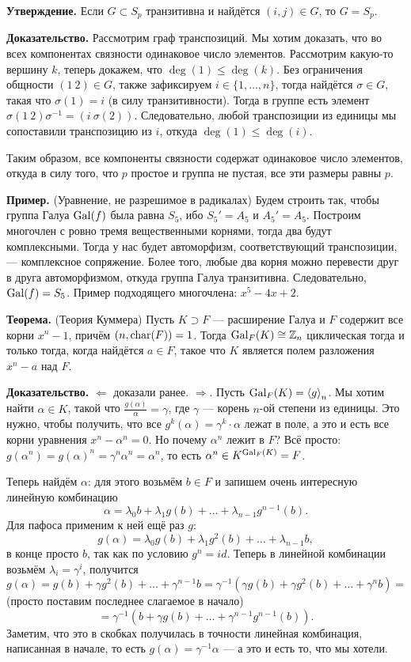 \textbf{Утверждение.} Если $G \subset S_p$ транзитивна и найдётся $(i, j) \in G$, то $G = S_p$.

\textbf{Доказательство.} Рассмотрим граф транспозиций.
Мы хотим доказать, что во всех компонентах связности одинаковое число элементов.
Рассмотрим какую-то вершину $k$, теперь докажем, что $\deg(1) \le \deg(k)$.
Без ограничения общности $(1~2) \in G$, также зафиксируем $i \in \{1, \dots, n\}$, тогда найдётся $\sigma \in G$, такая что $\sigma(1) = i$ (в силу транзитивности).
Тогда в группе есть элемент $\sigma (1~2) \sigma^{-1} = (i~\sigma(2))$.
Следовательно, любой транспозиции из единицы мы сопоставили транспозицию из $i$, откуда $\deg(1) \le \deg(i)$.

Таким образом, все компоненты связности содержат одинаковое число элементов, откуда в силу того, что $p$ простое и группа не пустая, все эти размеры равны $p$.

\QED

\textbf{Пример.} (Уравнение, не разрешимое в радикалах) Будем строить так, чтобы группа Галуа $\operatorname{Gal}(f)$ была равна $S_5$, ибо $S_5' = A_5$ и $A_5' = A_5$.
Построим многочлен с ровно тремя вещественными корнями, тогда два будут комплексными.
Тогда у нас будет автоморфизм, соответствующий транспозиции, --- комплексное сопряжение.
Более того, любые два корня можно перевести друг в друга автоморфизмом, откуда группа Галуа транзитивна.
Следовательно, $\operatorname{Gal}(f) = S_5$.
Пример подходящего многочлена: $x^5 - 4x + 2$.


\textbf{Теорема.} (Теория Куммера) Пусть $K \supset F$ --- расширение Галуа и $F$ содержит все корни $x^n - 1$, причём $(n, \operatorname{char}(F)) = 1$.
Тогда $\operatorname{Gal}_F(K) \cong \mathbb Z_n$ циклическая тогда и только тогда, когда найдётся $a \in F$, такое что $K$ является полем разложения $x^n - a$ над $F$.

\textbf{Доказательство.}
$\Leftarrow$ доказали ранее.
$\Rightarrow$. Пусть $\operatorname{Gal}_F(K) = \left<g\right>_n$.
Мы хотим найти $\alpha \in K$, такой что $\frac{g(\alpha)}{\alpha} = \gamma$, где $\gamma$ --- корень $n$-ой степени из единицы.
Это нужно, чтобы получить, что все $g^k(\alpha) = \gamma^k \cdot \alpha$ лежат в поле, а это и есть все корни уравнения $x^n - \alpha^n = 0$.
Но почему $\alpha^n$ лежит в $F$?
Всё просто: $g(\alpha^n) = g(\alpha)^n = \gamma^n \alpha^n = \alpha^n$, то есть $\alpha^n \in K^{\operatorname{Gal}_F(K)} = F$.

Теперь найдём $\alpha$: для этого возьмём $b \in F$ и запишем очень интересную линейную комбинацию
\[
    \alpha = \lambda_0 b + \lambda_1 g(b) + \dots + \lambda_{n-1}g^{n-1}(b).
\]
Для пафоса применим к ней ещё раз $g$:
\[
    g(\alpha) = \lambda_0 g(b) + \lambda_1 g^2(b) + \dots + \lambda_{n-1} b,
\]
в конце просто $b$, так как по условию $g^n = id$.
Теперь в линейной комбинации возьмём $\lambda_i = \gamma^i$, получится
\[
    g(\alpha) = g(b) + \gamma g^2(b) + \dots + \gamma^{n-1} b = \gamma^{-1}(\gamma g(b) + \gamma g^2(b) + \dots + \gamma^n b) =
\]
(просто поставим последнее слагаемое в начало)
\[
    = \gamma^{-1}(b + \gamma g(b) + \dots + \gamma^{n-1} g^{n-1}(b)).
\]
Заметим, что это в скобках получилась в точности линейная комбинация, написанная в начале, то есть $g(\alpha) = \gamma^{-1} \alpha$ --- а это и есть то, что мы хотели.

